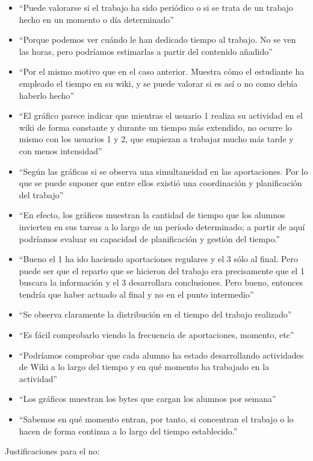 \begin{itemize}
\item ``Puede valorarse si el trabajo ha sido periódico o si se trata de un trabajo hecho en un momento o día determinado''
\item ``Porque podemos ver cuándo le han dedicado tiempo al trabajo. No se ven las horas, pero podríamos estimarlas a partir del contenido añadido''
\item ``Por el mismo motivo que en el caso anterior. Muestra cómo el estudiante ha empleado el tiempo en su wiki, y se puede valorar si es así o no como debía haberlo hecho''
\item ``El gráfico parece indicar que mientras el usuario 1 realiza su actividad en el wiki de forma constante y durante un tiempo más extendido, no ocurre lo mismo con los usuarios 1 y 2, que empiezan a trabajar mucho más tarde y con menos intensidad''
\item ``Según las gráficas si se observa una simultaneidad en las aportaciones. Por lo que se puede suponer que entre ellos existió una coordinación y planificación del trabajo''
\item ``En efecto, los gráficos muestran la cantidad de tiempo que los alumnos invierten en sus tareas a lo largo de un período determinado; a partir de aquí podríamos evaluar su capacidad de planificación y gestión del tiempo.''
\item ``Bueno el 1 ha ido haciendo aportaciones regulares y el 3 sólo al final. Pero puede ser que el reparto que se hicieron del trabajo era precisamente que el 1 buscara la información y el 3 desarrollara conclusiones. Pero bueno, entonces tendría que haber actuado al final y no en el punto intermedio''
\item ``Se observa claramente la distribución en el tiempo del trabajo realizado''
\item ``Es fácil comprobarlo viendo la frecuencia de aportaciones, momento, etc''
\item ``Podríamos comprobar que cada alumno ha estado desarrollando actividades de Wiki a lo largo del tiempo y en qué momento ha trabajado en la actividad''
\item ``Los gráficos muestran los bytes que cargan los alumnos por semana''
\item ``Sabemos en qué momento entran, por tanto, si concentran el trabajo o lo hacen de forma continua a lo largo del tiempo establecido.''
\end{itemize}

Justificaciones para el no:

